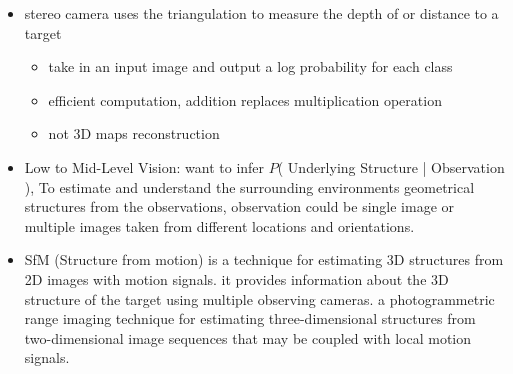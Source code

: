 \documentclass[10pt]{article}
\begin{document}
\begin{itemize}[label=\(\star\), leftmargin=1em, itemsep=-0.3em]
    \item stereo camera uses the triangulation to measure the depth of or distance to a target
          \begin{itemize}[label=\(\star\), leftmargin=1em, itemsep=-0.3em]
              \item take in an input image and output a log probability for each class
              \item efficient computation, addition replaces multiplication operation
              \item not 3D maps reconstruction
          \end{itemize}
    \item Low to Mid-Level Vision: want to infer $P$( Underlying Structure | Observation ), To estimate and understand the surrounding environments geometrical structures from the observations, observation could be single image or multiple images taken from different locations and orientations.
    \item SfM (Structure from motion) is a technique for estimating 3D structures from 2D images with motion signals. it provides information about the 3D structure of the target using multiple observing cameras. a photogrammetric range imaging technique for estimating three-dimensional structures from two-dimensional image sequences that may be coupled with local motion signals.


\end{itemize}
\end{document}
